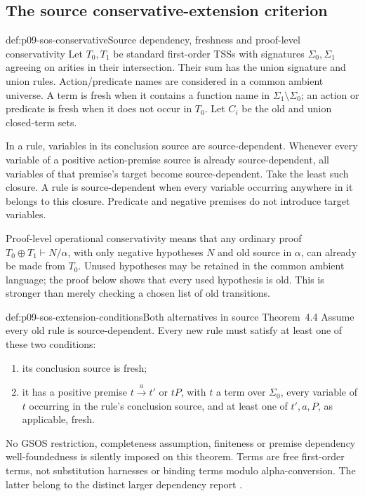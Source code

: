 \subsection{The source conservative-extension criterion}

\begin{hbdefinition}{def:p09-sos-conservative}{Source dependency, freshness and proof-level conservativity}
Let \(T_0,T_1\) be standard first-order TSSs with signatures
\(\Sigma_0,\Sigma_1\) agreeing on arities in their intersection.
Their sum has the union signature and union rules. Action/predicate
names are considered in a common ambient universe. A term is fresh
when it contains a function name in \(\Sigma_1\setminus\Sigma_0\);
an action or predicate is fresh when it does not occur in \(T_0\).
Let \(C_i\) be the old and union closed-term sets.

In a rule, variables in its conclusion source are source-dependent.
Whenever every variable of a positive action-premise source is already
source-dependent, all variables of that premise's target become
source-dependent. Take the least such closure. A rule is source-dependent
when every variable occurring anywhere in it belongs to this closure.
Predicate and negative premises do not introduce target variables.

Proof-level operational conservativity means that any ordinary proof
\(T_0\oplus T_1\vdash N/\alpha\), with only negative hypotheses
\(N\) and old source in \(\alpha\), can already be made from
\(T_0\). Unused hypotheses may be retained in the common ambient
language; the proof below shows that every used hypothesis is old.
This is stronger than merely checking a chosen list of old transitions.
\end{hbdefinition}

\begin{hbdefinition}{def:p09-sos-extension-conditions}{Both alternatives in source Theorem~4.4}
Assume every old rule is source-dependent. Every new rule must satisfy
at least one of these two conditions:
\begin{enumerate}
\item its conclusion source is fresh;
\item it has a positive premise \(t\xrightarrow a t'\) or
      \(tP\), with \(t\) a term over \(\Sigma_0\), every
      variable of \(t\) occurring in the rule's conclusion source,
      and at least one of \(t',a,P\), as applicable, fresh.
\end{enumerate}
No GSOS restriction, completeness assumption, finiteness or premise
dependency well-foundedness is silently imposed on this theorem.
Terms are free first-order terms, not substitution harnesses or
binding terms modulo alpha-conversion. The latter belong to the
distinct larger dependency report
\parencite{FokkinkVerhoef1995SOSBindingReport}.
\end{hbdefinition}

